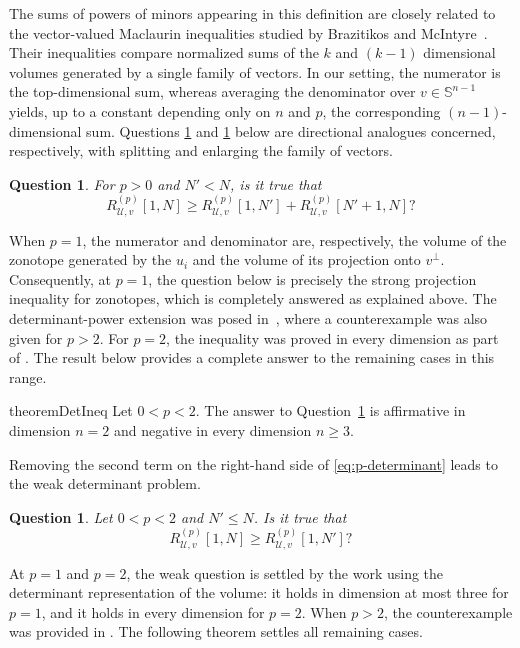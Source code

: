\documentclass[11pt,a4paper]{amsart}
\theoremstyle{plain}
\newtheorem{ques}[conj]{Question}
\theoremstyle{definition}
\begin{document}
The sums of powers of minors appearing in this definition are closely
related to the vector-valued Maclaurin inequalities studied by
Brazitikos and McIntyre~\cite{BM-22}. Their inequalities compare
normalized sums of the $k$ and $(k-1)$ dimensional volumes
generated by a single family of vectors. In our setting, the numerator
is the top-dimensional sum, whereas averaging the denominator over
$v\in {\mathbb S}^{n-1}$ yields, up to a constant depending only on $n$ and
$p$, the corresponding $(n-1)$-dimensional sum. Questions \ref{ques:p-determinant}
and \ref{ques:p-determinant-weak} below are directional analogues concerned, respectively, with
splitting and enlarging the family of vectors.



\begin{ques}\label{ques:p-determinant}
For $p>0$ and $N'< N$, is it true that
\begin{equation}\label{eq:p-determinant}
 R_{\mathcal U,v}^{(p)}[1,N] \geq R_{\mathcal U,v}^{(p)}[1,N']
 +R_{\mathcal U,v}^{(p)}[N'+1,N]?
\end{equation}
\end{ques}
When $p=1$, the numerator and denominator are, respectively, the volume of the zonotope generated by the $u_i$ and the volume of its projection onto $v^\perp$. Consequently, at $p=1$, the
question below is precisely the strong projection inequality for zonotopes,
which is completely answered as explained above.  The determinant-power extension was posed
in~\cite[Question~6.10]{FMMZ-24}, where a counterexample was also given for $p >2$.
For $p=2$, the inequality was proved in every dimension as part of \cite[Theorem 6.2]{FMMZ-24}. The result below provides a complete answer to the remaining cases in this range.

\begin{restatable}{theorem}{DetIneq}\label{thm:determinant-ineq-2}
Let $0<p<2$.  The answer to Question~\ref{ques:p-determinant} is affirmative
in dimension $n=2$ and negative in every dimension $n\geq3$.
\end{restatable}

Removing the second term on the right-hand side of \eqref{eq:p-determinant} leads to the weak determinant problem.

\begin{ques}\label{ques:p-determinant-weak}
Let $0<p<2$ and $N'\leq N$. Is it true that 
\begin{equation}\label{eq:p-determinant-}
  R_{\mathcal U,v}^{(p)}[1,N]\geq R_{\mathcal U,v}^{(p)}[1,N']?
\end{equation}
\end{ques}
At $p=1$ and $p = 2$, the weak question is settled by the work \cite{B-1929, FMMZ-24, FHMNWZ-26-I} using the determinant representation of the volume: it holds in dimension at most three for $p =1$, and it holds in every dimension for $p=2$. When $p >2$, the counterexample was provided in \cite{FMMZ-24}.
The following theorem settles all remaining cases.
\end{document}
